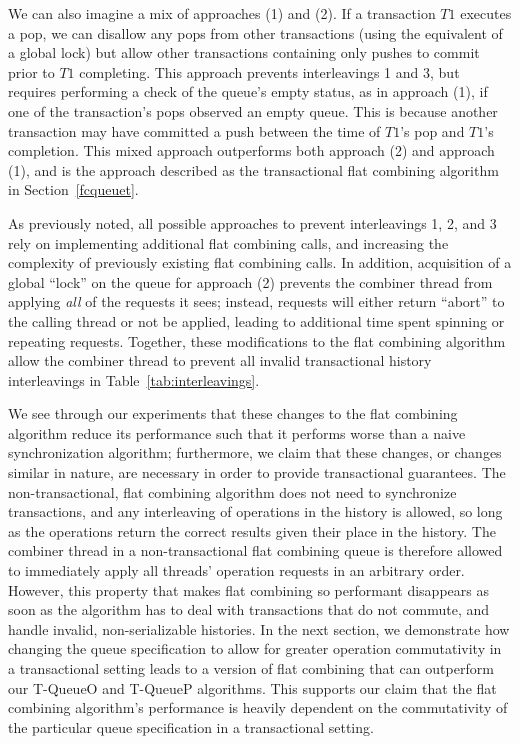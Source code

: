 We can also imagine a mix of approaches (1) and (2). If a transaction $T1$ executes a pop, we can disallow any pops from other transactions (using the equivalent of a global lock) but allow other transactions containing only pushes to commit prior to $T1$ completing. This approach prevents interleavings 1 and 3, but requires performing a check of the queue's empty status, as in approach (1), if one of the transaction's pops observed an empty queue. This is because another transaction may have committed a push between the time of $T1$'s pop and $T1$'s completion. This mixed approach outperforms both approach (2) and approach (1), and is the approach described as the transactional flat combining algorithm in Section~\ref{fcqueuet}. 

As previously noted, all possible approaches to prevent interleavings 1, 2, and 3 rely on implementing additional flat combining calls, and increasing the complexity of previously existing flat combining calls. In addition, acquisition of a global ``lock'' on the queue for approach (2) prevents the combiner thread from applying \emph{all} of the requests it sees; instead, requests will either return ``abort'' to the calling thread or not be applied, leading to additional time spent spinning or repeating requests. Together, these modifications to the flat combining algorithm allow the combiner thread to prevent all invalid transactional history interleavings in Table~\ref{tab:interleavings}.

We see through our experiments that these changes to the flat combining algorithm reduce its performance such that it performs worse than a naive synchronization algorithm; furthermore, we claim that these changes, or changes similar in nature, are necessary in order to provide transactional guarantees. The non-transactional, flat combining algorithm does not need to synchronize transactions, and any interleaving of operations in the history is allowed, so long as the operations return the correct results given their place in the history. The combiner thread in a non-transactional flat combining queue is therefore allowed to immediately apply all threads' operation requests in an arbitrary order. However, this property that makes flat combining so performant disappears as soon as the algorithm has to deal with transactions that do not commute, and handle invalid, non-serializable histories. In the next section, we demonstrate how changing the queue specification to allow for greater operation commutativity in a transactional setting leads to a version of flat combining that can outperform our T-QueueO and T-QueueP algorithms. This supports our claim that the flat combining algorithm's performance is heavily dependent on the commutativity of the particular queue specification in a transactional setting.

